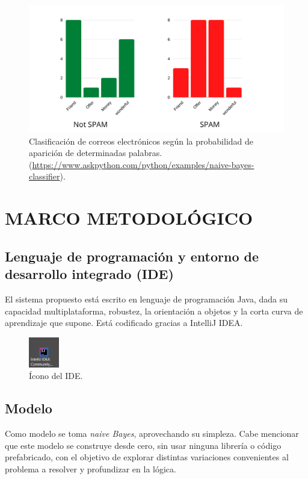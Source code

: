 \documentclass[sigconf]{acmart}
\begin{document}
\begin{figure}[h]
  \centering
  \includegraphics[width=\linewidth]{spamNaive}
  \caption{Clasificación de correos electrónicos según la probabilidad de aparición de determinadas palabras. (\url{https://www.askpython.com/python/examples/naive-bayes-classifier}).}
\end{figure}

\section{MARCO METODOLÓGICO}
\subsection{Lenguaje de programación y entorno de desarrollo integrado (IDE)}
El sistema propuesto está escrito en lenguaje de programación Java, dada su capacidad multiplataforma, robustez, la orientación a objetos y la corta curva de aprendizaje que supone. Está codificado gracias a IntelliJ IDEA.

\begin{figure}[h]
  \centering
  \includegraphics[width=50]{intellij}
  \caption{Ícono del IDE.}
\end{figure}

\subsection{Modelo}
Como modelo se toma {\itshape naive Bayes}, aprovechando su simpleza. Cabe mencionar que este modelo se construye desde cero, sin usar ninguna librería o código prefabricado, con el objetivo de explorar distintas variaciones convenientes al problema a resolver y profundizar en la lógica.
\end{document}

